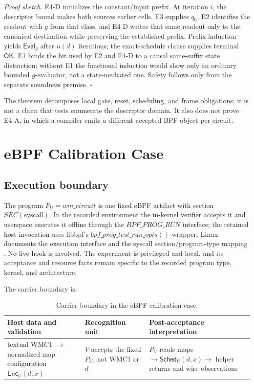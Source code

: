 \documentclass[conference]{IEEEtran}
\begin{document}
\emph{Proof sketch.} E4-D initializes the constant/input prefix. At iteration $i$, the descriptor bound makes both sources earlier cells. E3 supplies $q_0$, E2 identifies the readout with $g$ from that class, and E4-D writes that same readout only to the canonical destination while preserving the established prefix. Prefix induction yields $\mathsf{Eval}_g$ after $n(d)$ iterations; the exact-schedule clause supplies terminal $\mathsf{OK}$. E1 binds the bit used by E2 and E4-D to a causal same-suffix state distinction; without E1 the functional induction would show only an ordinary bounded $g$-evaluator, not a state-mediated one. Safety follows only from the separate soundness premise. \hfill$\square$

The theorem decomposes local gate, reset, scheduling, and frame obligations; it is not a claim that tests enumerate the descriptor domain. It also does not prove E4-A, in which a compiler emits a different accepted BPF object per circuit.

\section{eBPF Calibration Case}

\subsection{Execution boundary}

The program $P_U=\mathit{wm\_circuit}$ is one fixed eBPF artifact with section $\mathit{SEC}(\text{syscall})$. In the recorded environment the in-kernel verifier accepts it and userspace executes it offline through the $\mathit{BPF\_PROG\_RUN}$ interface; the retained host invocation uses libbpf's $\mathit{bpf\_prog\_test\_run\_opts}()$ wrapper. Linux documents the execution interface and the syscall section/program-type mapping \cite{ref6,ref7}. No live hook is involved. The experiment is privileged and local, and its acceptance and resource facts remain specific to the recorded program type, kernel, and architecture.

The carrier boundary is:

\begin{table}[t]
\caption{Carrier boundary in the eBPF calibration case.}
\label{tab:carrier-boundary}
\centering
\begin{tabularx}{\textwidth}{@{}Y Y Y@{}}
\toprule
Host data and validation & Recognition unit & Post-acceptance interpretation \\
\midrule
textual WMC1 $\rightarrow$ normalized map configuration $\mathsf{Enc}_U(d,x)$ & $V$ accepts the fixed $P_U$, not WMC1 or $d$ & $P_U$ reads maps $\rightarrow\mathsf{Sched}_U(d,x)\rightarrow$ helper returns and wire observations \\
\bottomrule
\end{tabularx}
\end{table}
\end{document}

